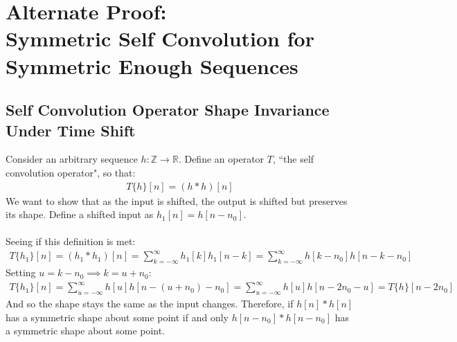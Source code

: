 \documentclass[a4paper]{article}
\newcommand{\op}[2]{#1\{#2\}}
\begin{document}
\section*{Alternate Proof: \\ Symmetric Self Convolution for Symmetric Enough Sequences}
\subsection*{Self Convolution Operator Shape Invariance Under Time Shift}
Consider an arbitrary sequence $h: \mathbb{Z} \rightarrow \mathbb{R}$. Define an operator $T$, ``the self convolution operator", so that:
\begin{align*}
\op{T}{h}[n] = (h*h)[n]
\end{align*}
We want to show that as the input is shifted, the output is shifted but preserves its shape. Define a shifted input as $h_1[n] = h[n-n_0]$.
\\\\
Seeing if this definition is met:
\begin{align*}
\op{T}{h_1}[n] = (h_1*h_1)[n] =  \sum_{k=-\infty}^{\infty}h_1[k]h_1[n-k] = \sum_{k=-\infty}^{\infty}h[k - n_0]h[n-k-n_0]
\end{align*}
Setting $u = k - n_0 \implies k = u + n_0$:
\begin{align*}
\op{T}{h_1}[n] =  \sum_{u=-\infty}^{\infty}h[u]h[n-(u+n_0)-n_0] =\sum_{u=-\infty}^{\infty}h[u]h[n-2n_0 -u] = \op{T}{h}[n-2n_0]
\end{align*}
And so the shape stays the same as the input changes. Therefore, if $h[n]*h[n]$ has a symmetric shape about some point if and only $h[n-n_0]*h[n-n_0]$ has a symmetric shape about some point.
\end{document}
